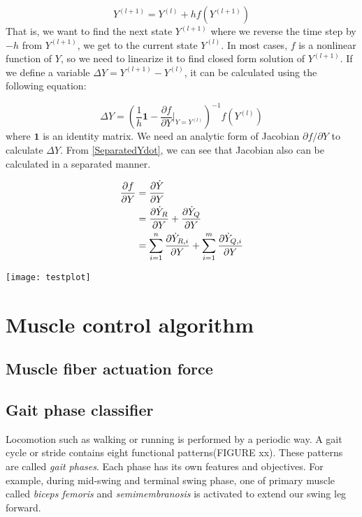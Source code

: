 \documentclass[a4paper,10pt]{article}
\begin{document}
\begin{equation}
Y^{(l+1)}=Y^{(l)}+hf(Y^{(l+1)})
\end{equation}
That is, we want to find the next state $Y^{(l+1)}$ where we
reverse the time step by $-h$ from $Y^{(l+1)}$, we get to the current state
$Y^{(l)}$. In most cases, $f$ is a nonlinear function of $Y$, so we need to
linearize it to find closed form solution of $Y^{(l+1)}$. If we define a
variable $\Delta Y = Y^{(l+1)}-Y^{(l)}$, it can be calculated using the
following equation:

\begin{equation}\label{DeltaY}
\Delta Y = \left(  \frac{1}{h}\mathbf{1} - {\frac{\partial f}{\partial Y} \bigg|_{Y=Y^{(l)}}}\right)^{-1} f(Y^{(l)})
\end{equation}
where $\mathbf{1}$ is an identity matrix. We need an analytic form of
Jacobian $\partial f / \partial Y$ to calculate $\Delta Y$.
From \eqref{SeparatedYdot}, we can see that
Jacobian also can be calculated in a separated manner.


\begin{align}
\frac{\partial f}{\partial Y}
        & = \frac{\partial\dot{Y}}{\partial Y}\notag\\
        & = \frac{\partial\dot{Y}_R}{\partial Y} + \frac{\partial\dot{Y}_Q}{\partial Y}\notag\\
        & = \sum_{i=1}^{n}\frac{\partial\dot{Y}_{R,i}}{\partial Y} + \sum_{i=1}^{m}\frac{\partial\dot{Y}_{Q,i}}{\partial Y}
\end{align}

\texttt{[image: testplot]}




\section{Muscle control algorithm}

\subsection{Muscle fiber actuation force}

\subsection{Gait phase classifier}

Locomotion such as walking or running is performed by a periodic way.
A gait cycle or stride contains eight functional patterns(FIGURE xx).
\cite{perry} These patterns are called \emph{gait phases}. Each phase has its
own features and objectives. For example, during mid-swing and terminal swing
phase, one of primary muscle called \emph{biceps femoris} and \emph{semimembranosis} is
activated to extend our swing leg forward.
\end{document}
